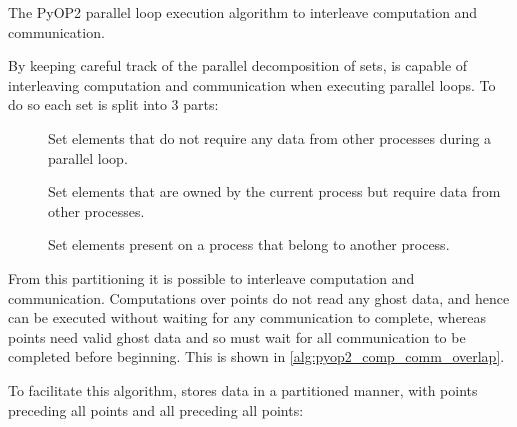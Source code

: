 \documentclass[thesis]{subfiles}
\begin{document}
\begin{algorithm}
  \caption{The PyOP2 parallel loop execution algorithm to interleave computation and communication.}
  \begin{algorithmic}[1]
    \State {} 

     
      \State {}
    \EndFor

    \State {} 

     
      \State {}
    \EndFor
  \end{algorithmic}
  \label{alg:pyop2_comp_comm_overlap}
\end{algorithm}

By keeping careful track of the parallel decomposition of sets,  is capable of interleaving computation and communication when executing parallel loops.
To do so each set is split into 3 parts:

\begin{description}
  \item[\coreiter]
    Set elements that do not require any data from other processes during a parallel loop.

  \item[\ownediter]
    Set elements that are owned by the current process but require data from other processes.

  \item[\ghostiter]
    Set elements present on a process that belong to another process.
\end{description}

From this partitioning it is possible to interleave computation and communication.
Computations over \coreiter points do not read any ghost data, and hence can be executed without waiting for any communication to complete, whereas \ownediter points need valid ghost data and so must wait for all communication to be completed before beginning.
This is shown in \cref{alg:pyop2_comp_comm_overlap}.

To facilitate this algorithm,  stores data in a partitioned manner, with \coreiter points preceding all \ownediter points and all \ownediter preceding all \ghostiter points:
\end{document}
